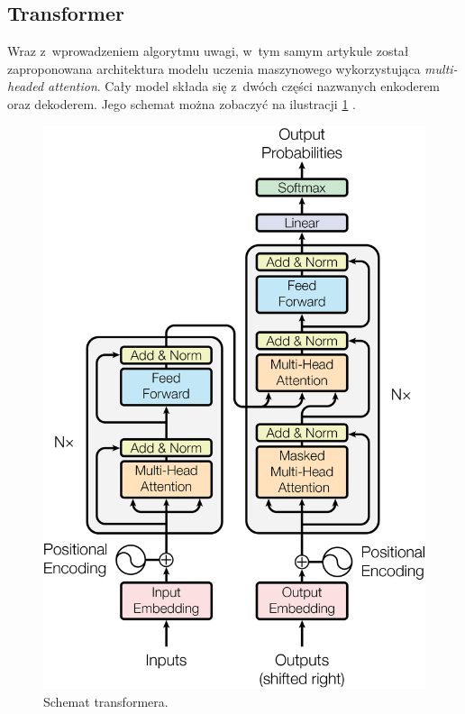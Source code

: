 \documentclass[data-science]{agh-wi} %
\begin{document}
\subsection{Transformer}
Wraz z~wprowadzeniem algorytmu uwagi, w~tym samym artykule został zaproponowana architektura modelu uczenia maszynowego wykorzystująca \textit{multi-headed attention}. Cały model składa się z~dwóch części nazwanych enkoderem oraz dekoderem. Jego schemat można zobaczyć na ilustracji \ref*{fig:transformer1} \cite*{attention}.

\begin{figure}[!ht]
    \begin{center}
        \includegraphics[width=0.7\linewidth]{img/transformer1}
    \end{center}
    \caption{Schemat transformera.}
    \label{fig:transformer1}
\end{figure}
\end{document}
